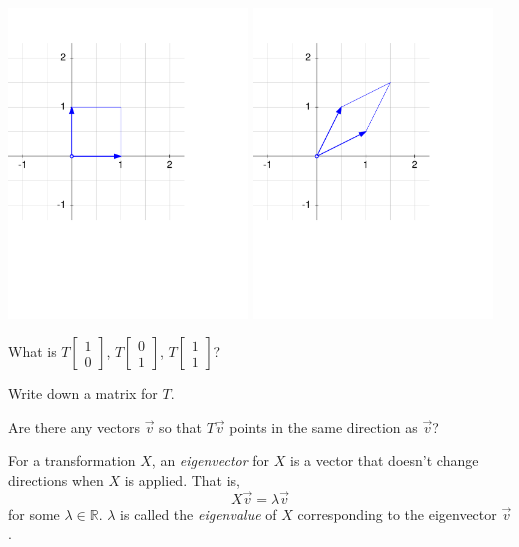 \documentclass[letter]{article}
\newcommand{\R}{\mathbb{R}}
\newcommand{\mat}[1]{\begin{bmatrix}#1\end{bmatrix}}
\begin{document}
	\includegraphics[width=2.5in]{images/transform1b.pdf}
	\includegraphics[width=2.5in]{images/transform2b.pdf}


	\vspace{-6em}
	\begin{Enum}
		\item What is $T\mat{1\\0}$, $T\mat{0\\1}$, $T\mat{1\\1}$?
		\item Write down a matrix for $T$.
		\item Are there any vectors $\vec v$ so that $T\vec v$ points in the
			same direction as $\vec v$?
	\end{Enum}
	
	\begin{Def}
	For a transformation $X$, an \emph{eigenvector} for $X$ is a vector that doesn't
	change directions when $X$ is applied.  That is,
	\[
		X\vec v=\lambda \vec v
	\]
	for some $\lambda\in\R$.  $\lambda$ is called the \emph{eigenvalue} 
	of $X$ corresponding
	to the eigenvector $\vec v$.
	\end{Def}
\end{document}
